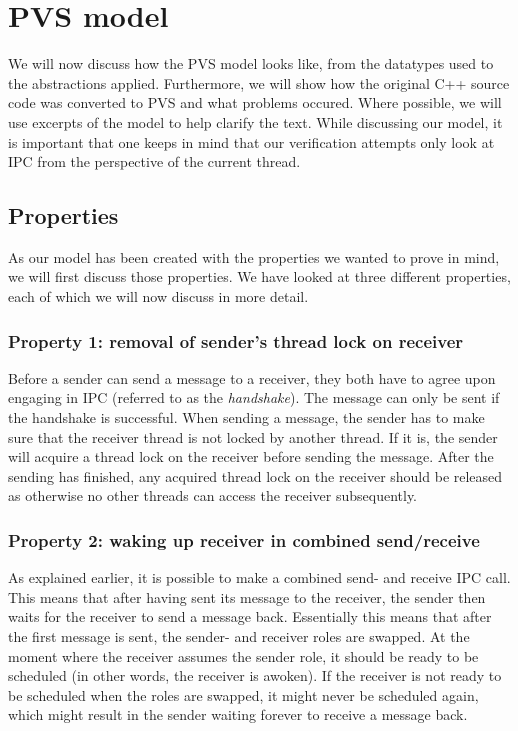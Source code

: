 \section{PVS model}
We will now discuss how the PVS model looks like, from the datatypes used to the abstractions applied. Furthermore, we will show how the original C++ source code was converted to PVS and what problems occured. Where possible, we will use excerpts of the model to help clarify the text. While discussing our model, it is important that one keeps in mind that our verification attempts only look at IPC from the perspective of the current thread.

\subsection{Properties}
As our model has been created with the properties we wanted to prove in mind, we will first discuss those properties. We have looked at three different properties, each of which we will now discuss in more detail.

\subsubsection{Property 1: removal of sender's thread lock on receiver}
Before a sender can send a message to a receiver, they both have to agree upon engaging in IPC (referred to as the \emph{handshake}). The message can only be sent if the handshake is successful. When sending a message, the sender has to make sure that the receiver thread is not locked by another thread. If it is, the sender will acquire a thread lock on the receiver before sending the message. After the sending has finished, any acquired thread lock on the receiver should be released as otherwise no other threads can access the receiver subsequently.

\subsubsection{Property 2: waking up receiver in combined send/receive}
As explained earlier, it is possible to make a combined send- and receive IPC call. This means that after having sent its message to the receiver, the sender then waits for the receiver to send a message back. Essentially this means that after the first message is sent, the sender- and receiver roles are swapped. At the moment where the receiver assumes the sender role, it should be ready to be scheduled (in other words, the receiver is awoken). If the receiver is not ready to be scheduled when the roles are swapped, it might never be scheduled again, which might result in the sender waiting forever to receive a message back.

